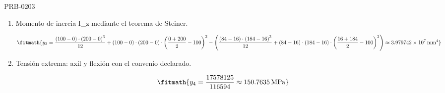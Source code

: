 \begin{studiumworked}{PRB-0203}
\begin{enumerate}
\[\fitmath{y_{2}=\frac{\frac{\left(100-0\right)\cdot \left(200-0\right)\cdot \left(0+200\right)}{2}-\frac{\left(84-16\right)\cdot \left(184-16\right)\cdot \left(16+184\right)}{2}}{\left(100-0\right)\cdot \left(200-0\right)-\left(84-16\right)\cdot \left(184-16\right)}\approx 100\,\mathrm{mm}}\]

\item Momento de inercia I\_z mediante el teorema de Steiner.

\[\fitmath{y_{3}=\frac{\left(100-0\right)\cdot {\left(200-0\right)}^{3}}{12}+\left(100-0\right)\cdot \left(200-0\right)\cdot {\left(\frac{0+200}{2}-100\right)}^{2}-\left(\frac{\left(84-16\right)\cdot {\left(184-16\right)}^{3}}{12}+\left(84-16\right)\cdot \left(184-16\right)\cdot {\left(\frac{16+184}{2}-100\right)}^{2}\right)\approx 3.979742\times10^{7}\,\mathrm{mm^{4}}}\]

\item Tensión extrema: axil y flexión con el convenio declarado.

\[\fitmath{y_{4}=\frac{17578125}{116594}\approx 150.7635\,\mathrm{MPa}}\]

\end{enumerate}


\end{studiumworked}
